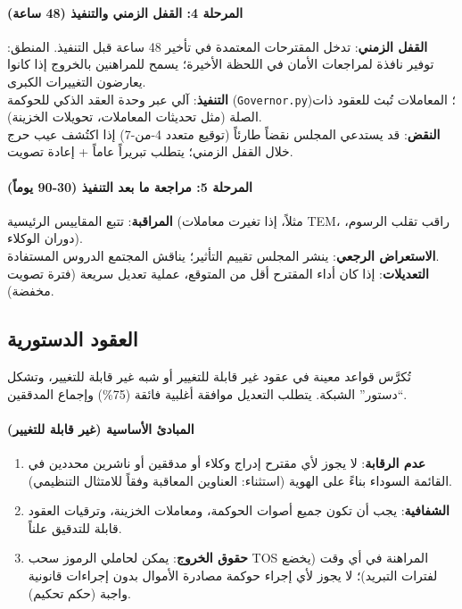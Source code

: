 \documentclass[11pt]{article}
\begin{document}
\paragraph{المرحلة 4: القفل الزمني والتنفيذ (48 ساعة)}
\textbf{القفل الزمني}: تدخل المقترحات المعتمدة في تأخير 48 ساعة قبل التنفيذ. المنطق: توفير نافذة لمراجعات الأمان في اللحظة الأخيرة؛ يسمح للمراهنين بالخروج إذا كانوا يعارضون التغييرات الكبرى.\\
\textbf{التنفيذ}: آلي عبر وحدة العقد الذكي للحوكمة (\texttt{Governor.py})؛ المعاملات تُبث للعقود ذات الصلة (مثل تحديثات المعاملات، تحويلات الخزينة).\\
\textbf{النقض}: قد يستدعي المجلس نقضاً طارئاً (توقيع متعدد 4-من-7) إذا اكتُشف عيب حرج خلال القفل الزمني؛ يتطلب تبريراً عاماً + إعادة تصويت.

\paragraph{المرحلة 5: مراجعة ما بعد التنفيذ (30-90 يوماً)}
\textbf{المراقبة}: تتبع المقاييس الرئيسية (مثلاً، إذا تغيرت معاملات TEM، راقب تقلب الرسوم، دوران الوكلاء).\\
\textbf{الاستعراض الرجعي}: ينشر المجلس تقييم التأثير؛ يناقش المجتمع الدروس المستفادة.\\
\textbf{التعديلات}: إذا كان أداء المقترح أقل من المتوقع، عملية تعديل سريعة (فترة تصويت مخفضة).

\subsection{العقود الدستورية}

تُكرَّس قواعد معينة في عقود غير قابلة للتغيير أو شبه غير قابلة للتغيير، وتشكل ``دستور'' الشبكة. يتطلب التعديل موافقة أغلبية فائقة (75\%) وإجماع المدققين.

\paragraph{المبادئ الأساسية (غير قابلة للتغيير)}
\begin{enumerate}[noitemsep]
  \item \textbf{عدم الرقابة}: لا يجوز لأي مقترح إدراج وكلاء أو مدققين أو ناشرين محددين في القائمة السوداء بناءً على الهوية (استثناء: العناوين المعاقبة وفقاً للامتثال التنظيمي).
  \item \textbf{الشفافية}: يجب أن تكون جميع أصوات الحوكمة، ومعاملات الخزينة، وترقيات العقود قابلة للتدقيق علناً.
  \item \textbf{حقوق الخروج}: يمكن لحاملي الرموز سحب TOS المراهنة في أي وقت (يخضع لفترات التبريد)؛ لا يجوز لأي إجراء حوكمة مصادرة الأموال بدون إجراءات قانونية واجبة (حكم تحكيم).
\end{enumerate}
\end{document}
